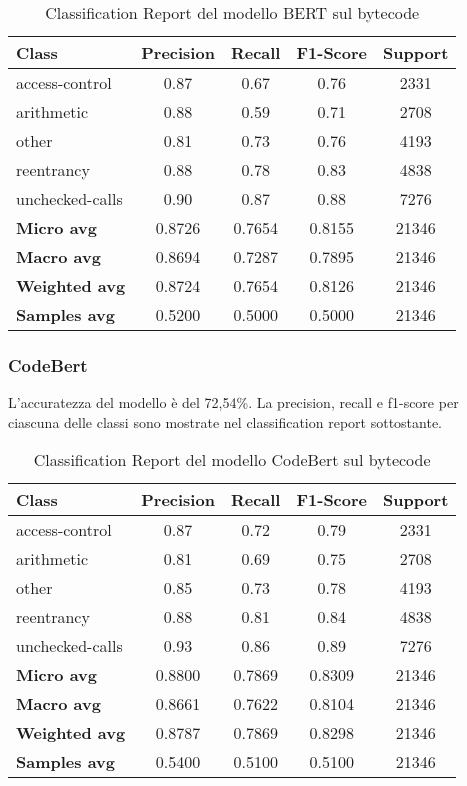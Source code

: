 \documentclass[../../Thesis.tex]{subfiles}
\begin{document}
\begin{table}[H]
\centering
\small
\begin{tabular}{lcccc}
\hline
\textbf{Class} & \textbf{Precision} & \textbf{Recall} & \textbf{F1-Score} & \textbf{Support} \\
\hline
access-control & 0.87 & 0.67 & 0.76 & 2331 \\
arithmetic & 0.88 & 0.59 & 0.71 & 2708 \\
other & 0.81 & 0.73 & 0.76 & 4193 \\
reentrancy & 0.88 & 0.78 & 0.83 & 4838 \\
unchecked-calls & 0.90 & 0.87 & 0.88 & 7276 \\
\hline
\textbf{Micro avg} & 0.8726 & 0.7654 & 0.8155 & 21346 \\
\textbf{Macro avg} & 0.8694 & 0.7287 & 0.7895 & 21346 \\
\textbf{Weighted avg} & 0.8724 & 0.7654 & 0.8126 & 21346 \\
\textbf{Samples avg} & 0.5200 & 0.5000 & 0.5000 & 21346 \\
\hline
\end{tabular}
\caption{Classification Report del modello BERT sul bytecode}
\end{table}

\subsubsection{CodeBert}

L'accuratezza del modello è del 72,54\%. La precision, recall e f1-score per ciascuna delle classi sono mostrate nel classification report sottostante.

\begin{table}[H]
\centering
\small
\begin{tabular}{lcccc}
\hline
\textbf{Class} & \textbf{Precision} & \textbf{Recall} & \textbf{F1-Score} & \textbf{Support} \\
\hline
access-control & 0.87 & 0.72 & 0.79 & 2331 \\
arithmetic & 0.81 & 0.69 & 0.75 & 2708 \\
other & 0.85 & 0.73 & 0.78 & 4193 \\
reentrancy & 0.88 & 0.81 & 0.84 & 4838 \\
unchecked-calls & 0.93 & 0.86 & 0.89 & 7276 \\
\hline
\textbf{Micro avg} & 0.8800 & 0.7869 & 0.8309 & 21346 \\
\textbf{Macro avg} & 0.8661 & 0.7622 & 0.8104 & 21346 \\
\textbf{Weighted avg} & 0.8787 & 0.7869 & 0.8298 & 21346 \\
\textbf{Samples avg} & 0.5400 & 0.5100 & 0.5100 & 21346 \\
\hline
\end{tabular}
\caption{Classification Report del modello CodeBert sul bytecode}
\end{table}
\end{document}
